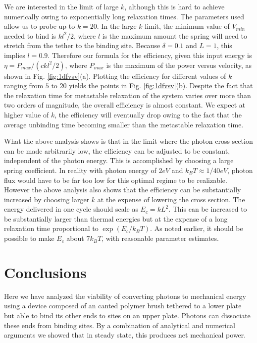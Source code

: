 \documentclass[11pt]{ucthesis}
\begin{document}
We are interested in the limit of large $k$, although this is hard to achieve
numerically owing to exponentially long relaxation times. The parameters used
allow us to probe up to $k=20$. 
In the large $k$ limit, the  minimum value of $V_{min}$ needed to bind is
$k l^2 /2$, where $l$ is the maximum amount the spring will need to stretch
from the tether to the binding site. Because $\delta = 0.1$ and $L=1$, this
implies $l=0.9$. Therefore our formula for the efficiency, given this input
energy is $\eta = P_{max}/(c k l^2 /2)$, where $P_{max}$ is the maximum of the
power versus velocity, as shown in Fig. \ref{fig:1dfvsv}(a). Plotting the
efficiency for different values of $k$ ranging from $5$ to $20$ yields the
points in Fig. \ref{fig:1dfvsv}(b). 
Despite the fact that the relaxation time for metastable relaxation of the system
varies over more than two orders of magnitude, the overall efficiency is almost
constant. We expect at higher value of $k$, the efficiency will eventually drop
owing to the fact that the average unbinding time becoming smaller than the
metastable relaxation time.

What the above analysis shows is that in the limit where the photon cross section can be made arbitrarily low, the efficiency 
can be adjusted to be constant, independent of the photon energy. This is
accomplished by choosing a large spring coefficient. In reality
with photon energy of $2 eV$ and $k_B T \approx 1/40 eV$, photon flux would have
to be far too low for this optimal regime to be realizable. However the
above analysis also shows that the efficiency can be substantially increased by
choosing larger $k$ at the expense of lowering the cross section. The energy
delivered in one cycle should scale as $E_c = k L^2$. This can be increased to
be substantially larger than thermal energies but at the expense of a long
relaxation time proportional to $\exp(E_c/k_B T)$. As noted earlier, it should
be possible to make $E_c$ about $7 k_B T$, with reasonable parameter estimates. 

\section{Conclusions}
\label{sec:Conclusions}
Here we have analyzed the viability of converting photons to mechanical
energy using a device composed of an canted polymer brush tethered to a
lower plate but able to bind its other ends to sites on an upper plate. Photons can dissociate
these ends from binding sites. By a combination of analytical and numerical arguments we showed
that in steady state, this produces net mechanical power.
\end{document}

